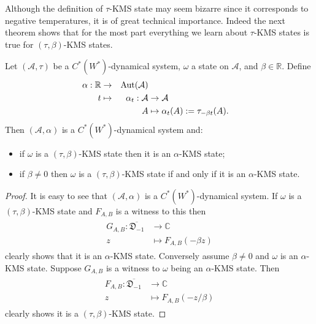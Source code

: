 Although the definition of $\tau$-KMS state may seem bizarre since it corresponds to negative temperatures, it is of great technical importance. Indeed the next theorem shows that for the most part everything we learn about $\tau$-KMS states is true for $(\tau,\beta)$-KMS states.

\begin{theorem}
Let $(\mathcal{A},\tau)$ be a $C^*(W^*)$-dynamical system, $\omega$ a state on $\mathcal{A}$, and $\beta\in\mathbb{R}$. Define
\begin{alignat}{2}
\alpha:\mathbb{R}&\rightarrow & \operatorname{Aut}(\mathcal{A}) \nonumber \\
t&\mapsto &\alpha_t:\mathcal{A} & \rightarrow\mathcal{A} \\
&&A&\mapsto \alpha_t(A):=\tau_{-\beta t}(A). \nonumber
\end{alignat}
Then $(\mathcal{A},\alpha)$ is a $C^*(W^*)$-dynamical system and:
\begin{itemize}
\item if $\omega$ is a $(\tau,\beta)$-KMS state then it is an $\alpha$-KMS state;
\item if $\beta\neq 0$ then $\omega$ is a $(\tau,\beta)$-KMS state if and only if it is an $\alpha$-KMS state. 
\end{itemize}
\end{theorem}

\begin{proof}
It is easy to see that $(\mathcal{A},\alpha)$ is a $C^*(W^*)$-dynamical system.
If $\omega$ is a $(\tau,\beta)$-KMS state and $F_{A,B}$ is a witness to this then
\begin{align}
\begin{split}
G_{A,B}:\overline{\mathfrak{D}_{-1}}&\rightarrow\mathbb{C} \\
z&\mapsto F_{A,B}(-\beta z)
\end{split}
\end{align} 
clearly shows that it is an $\alpha$-KMS state.
Conversely assume $\beta\neq 0$ and $\omega$ is an $\alpha$-KMS state. Suppose $G_{A,B}$ is a witness to $\omega$ being an $\alpha$-KMS state. Then  
\begin{align}
\begin{split}
F_{A,B}:\overline{\mathfrak{D}_{-1}}&\rightarrow\mathbb{C} \\
z&\mapsto F_{A,B}(-z/\beta)
\end{split}
\end{align} 
clearly shows it is a $(\tau,\beta)$-KMS state.
\end{proof}

